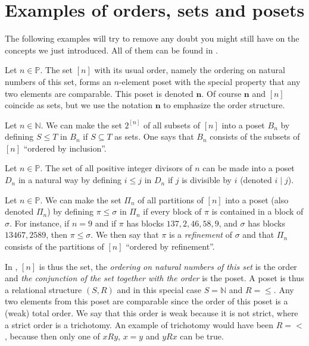 \section{Examples of orders, sets and posets}


The following examples will try to remove any doubt you might still have on the concepts we just introduced. All of them can be found in \cite{Stanley:2011:ECV:2124415}.




\begin{example}
\label{ex:poset:def}

\item \label{ex:poset:def:a} Let $n \in \mathbb{P}$. The set $[n]$ with its usual order, namely the ordering on natural numbers of this set, forms an $n$-element poset with the special property that any two elements are comparable. This poset is denoted $\bm{n}$. Of course $\bm{n}$ and $[n]$ coincide as sets, but we use the notation $\bm{n}$ to emphasize the order structure. 

\item \label{ex:poset:def:b} Let $n \in \mathbb{N}$. We can make the set $2^{[n]}$ of all subsets of $[n]$ into a poset $B_n$ by defining $S \leq T$ in $B_n$ if $S \subseteq T$ as sets. One says that $B_n$ consists of the subsets of $[n]$ ``ordered by inclusion''. 

\item \label{ex:poset:def:c}  Let $n \in \mathbb{P}$. The set of all positive integer divisors of $n$ can be made into a poset $D_n$ in a natural way by defining $i \leq j$ in $D_n$ if $j$ is divisible by $i$ (denoted $i \mid j$). 

\item \label{ex:poset:def:d}  Let $n \in \mathbb{P}$. We can make the set $\Pi_n$ of all partitions of $[n]$ into a poset (also denoted $\Pi_n$) by defining $\pi \leq \sigma$ in $\Pi_n$ if every block of $\pi$ is contained in a block of $\sigma$. For instance, if $n = 9$ and if $\pi$ has blocks $137, 2, 46, 58, 9$, and $\sigma$ has blocks $13467, 2589$, then $\pi \leq \sigma$. We then say that $\pi$ is a \emph{refinement} of $\sigma$ and that $\Pi_n$ consists of the partitions of $[n]$ ``ordered by refinement''. 
\end{example}


In , $[n]$ is thus the set, the \emph{ordering on natural numbers of this set} is the order and \emph{the conjunction of the set together with the order} is the poset. A poset is thus a relational structure $(S, R)$ and in this special case $S = \mathbb{N}$ and $R = \le$. Any two elements from this poset are comparable since the order of this poset is a (weak) total order. We say that this order is weak because it is not strict, where a strict order is a trichotomy. An example of trichotomy would have been $R = <$, because then only one of $x R y$, $x = y$ and $y R x$ can be true.


